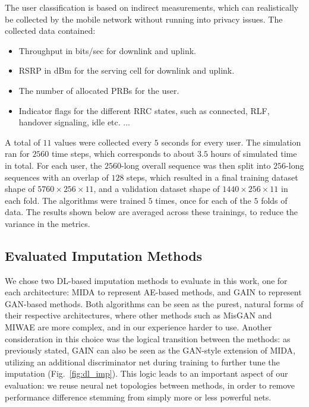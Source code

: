 				The user classification is based on indirect measurements, which can realistically be collected by the mobile network without running into privacy issues.
				The collected data contained:
				\begin{itemize}
					\item
					Throughput in bits/sec for downlink and uplink.
					
					\item
					\ac{RSRP} in dBm for the serving cell for downlink and uplink.
					
					\item
					The number of allocated \acp{PRB} for the user.
					
					\item
					Indicator flags for the different \ac{RRC} states, such as connected, \ac{RLF}, handover signaling, idle etc. ...
				\end{itemize}
				\noindent A total of $11$ values were collected every $5$ seconds for every user.		
				The simulation ran for $2560$ time steps, which corresponds to about $3.5$ hours of simulated time in total.
				For each user, the $2560$-long overall sequence was then split into $256$-long sequences with an overlap of $128$ steps, which resulted in a final training dataset shape of $5760 \times 256 \times 11$, and a validation dataset shape of $1440 \times 256 \times 11$ in each fold.
				The algorithms were trained $5$ times, once for each of the $5$ folds of data.
				The results shown below are averaged across these trainings, to reduce the variance in the metrics.
				
			
			\subsection{Evaluated Imputation Methods}
			
				We chose two \ac{DL}-based imputation methods to evaluate in this work, one for each architecture: \ac{MIDA} to represent \ac{AE}-based methods, and \ac{GAIN} to represent \ac{GAN}-based methods.
				Both algorithms can be seen as the purest, natural forms of their respective architectures, where other methods such as \ac{MisGAN} and \ac{MIWAE} are more complex, and in our experience harder to use. 
				Another consideration in this choice was the logical transition between the methods: as previously stated, \ac{GAIN} can also be seen as the \ac{GAN}-style extension of \ac{MIDA}, utilizing an additional discriminator net during training to further tune the imputation (Fig.~\ref{fig:dl_imp}).
				This logic leads to an important aspect of our evaluation: we reuse neural net topologies between methods, in order to remove performance difference stemming from simply more or less powerful nets.
				
